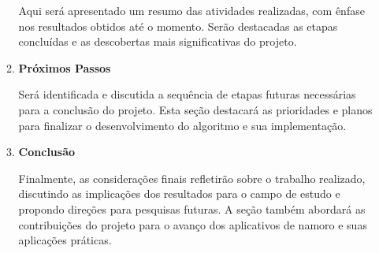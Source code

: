 \begin{enumerate}
\begin{enumerate}
        Aqui será apresentado um resumo das atividades realizadas, com ênfase nos resultados obtidos até o momento. Serão destacadas as etapas concluídas e as descobertas mais significativas do projeto.

        \item \textbf{Próximos Passos}
        
        Será identificada e discutida a sequência de etapas futuras necessárias para a conclusão do projeto. Esta seção destacará as prioridades e planos para finalizar o desenvolvimento do algoritmo e sua implementação.

        \item \textbf{Conclusão}
        
        Finalmente, as considerações finais refletirão sobre o trabalho realizado, discutindo as implicações dos resultados para o campo de estudo e propondo direções para pesquisas futuras. A seção também abordará as contribuições do projeto para o avanço dos aplicativos de namoro e suas aplicações práticas.
    \end{enumerate}
\end{enumerate}
